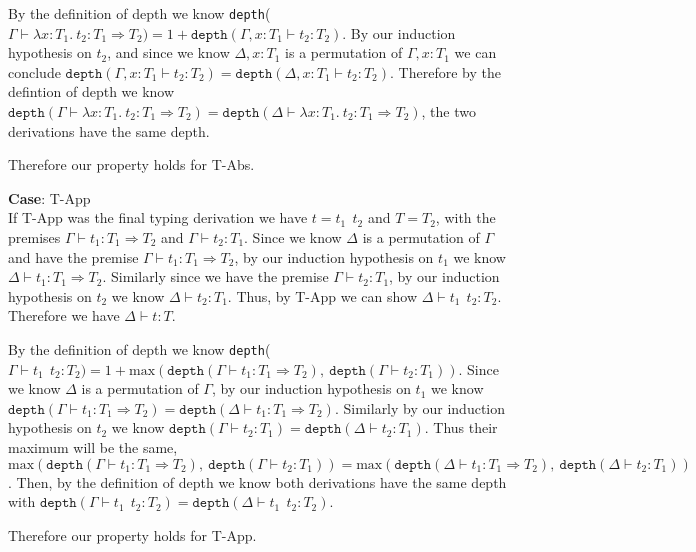 \documentclass[12pt, fleqn]{article}
\begin{document}
By the definition of depth we know \texttt{depth}($\Gamma \vdash \lambda x : T_1 . \: t_2 : T_1 \Rightarrow T_2) =  1 + 
\texttt{depth}(\Gamma, x: T_1 \vdash t_2: T_2)$. By our induction hypothesis on $t_2$, and since we know
$\Delta, x: T_1$ is a permutation of $\Gamma, x: T_1$ we can conclude 
$\texttt{depth}(\Gamma, x: T_1 \vdash t_2: T_2) = \texttt{depth}(\Delta, x: T_1 \vdash t_2: T_2)$. Therefore by the defintion of depth
we know $\texttt{depth}(\Gamma \vdash \lambda x : T_1 . \: t_2 : T_1 \Rightarrow T_2) = \texttt{depth}(\Delta \vdash \lambda x : T_1 . \: t_2 : T_1 \Rightarrow T_2)$,
the two derivations have the same depth.

Therefore our property holds for T-Abs.

\medskip
\textbf{Case}: T-App\\
If T-App was the final typing derivation we have $t = t_1\:\:t_2$ and $T = T_2$, with the premises $\Gamma \vdash t_1 : T_1 \Rightarrow T_2$
and $\Gamma \vdash t_2 : T_1$. Since we know $\Delta$ is a permutation of $\Gamma$ and have the premise $\Gamma \vdash t_1 : T_1 \Rightarrow T_2$,
by our induction hypothesis on $t_1$ we know $\Delta \vdash t_1 : T_1 \Rightarrow T_2$. Similarly since we have the premise $\Gamma \vdash t_2 : T_1$,
by our induction hypothesis on $t_2$ we know $\Delta \vdash t_2 : T_1$. Thus, by T-App we can show $\Delta \vdash t_1\:\:t_2 : T_2$.
Therefore we have $\Delta \vdash t : T$.

By the definition of depth we know \texttt{depth}($\Gamma \vdash t_1\:\:t_2 : T_2) = 1 + \textrm{max}(
\texttt{depth}(\Gamma \vdash t_1 : T_1 \Rightarrow T_2),~\texttt{depth}(\Gamma \vdash t_2 : T_1))$. Since we know
$\Delta$ is a permutation of $\Gamma$, by our induction hypothesis on $t_1$ we know 
$\texttt{depth}(\Gamma \vdash t_1 : T_1 \Rightarrow T_2) = \texttt{depth}(\Delta \vdash t_1 : T_1 \Rightarrow T_2)$. Similarly
by our induction hypothesis on $t_2$ we know $\texttt{depth}(\Gamma \vdash t_2 : T_1) = \texttt{depth}(\Delta \vdash t_2 : T_1)$.
Thus their maximum will be the same, $\textrm{max}(
    \texttt{depth}(\Gamma \vdash t_1 : T_1 \Rightarrow T_2),~\texttt{depth}(\Gamma \vdash t_2 : T_1))
= \textrm{max}(
    \texttt{depth}(\Delta \vdash t_1 : T_1 \Rightarrow T_2),~\texttt{depth}(\Delta \vdash t_2 : T_1))$.
Then, by the definition of depth we know both derivations have the same depth with
$\texttt{depth}(\Gamma \vdash t_1\:\:t_2 : T_2) = \texttt{depth}(\Delta \vdash t_1\:\:t_2 : T_2)$.

Therefore our property holds for T-App.
\end{document}
